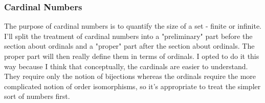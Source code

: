 






\subsubsection{Cardinal Numbers}
The purpose of cardinal numbers is to quantify the size of a set - finite or infinite. I'll split the treatment of cardinal numbers into a "preliminary" part before the section about ordinals and a "proper" part after the section about ordinals. The proper part will then really define them in terms of ordinals. I opted to do it this way because I think that conceptually, the cardinals are easier to understand. They require only the notion of bijections whereas the ordinals require the more complicated notion of order isomorphisms, so it's appropriate to treat the simpler sort of numbers first. 


